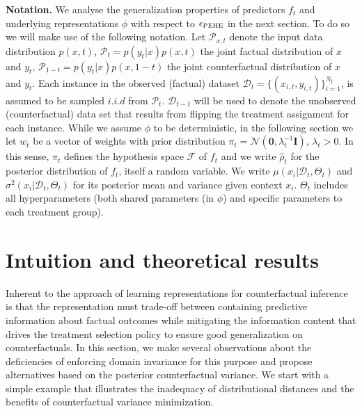 \documentclass[twoside]{article}
\begin{document}
\textbf{Notation.} We analyse the generalization properties of predictors $f_t$ and underlying representations $\phi$ with respect to $\epsilon_{\textsc{PEHE}}$ in the next section. To do so we will make use of the following notation. Let $\mathcal{P}_{x,t}$ denote the input data distribution $p(x,t)$, $\mathcal{P}_{t}=p(y_t|x)p(x,t)$ the joint factual distribution of $x$ and $y_t$, $\mathcal{P}_{1-t}=p(y_t|x)p(x,1-t)$ the joint counterfactual distribution of $x$ and $y_t$. Each instance in the observed (factual) dataset $\mathcal{D}_{t} = \{(x_{i,t}, y_{i,t})\}_{i=1}^{N_t}$, is assumed to be sampled $i.i.d$ from $\mathcal{P}_t$. $\mathcal{D}_{t-1}$ will be used to denote the unobserved (counterfactual) data set that results from flipping the treatment assignment for each instance. While we assume $\phi$ to be deterministic, in the following section we let $w_t$ be a vector of weights with prior distribution $\pi_t = \mathcal N(\mathbf{0},\lambda_t^{-1}\mathbf{I})$, $\lambda_t > 0$. In this sense, $\pi_t$ defines the hypothesis space $\mathcal F$ of $f_t$ and we write $\hat{\rho}_t$ for the posterior distribution of $f_t$, itself a random variable. We write $\mu(x_{i}|\mathcal{D}_t,\Theta_t)$ and $\sigma^2(x_{i}|\mathcal{D}_t,\Theta_t)$ for its posterior mean and variance given context $x_i$. $\Theta_t$ includes all hyperparameters (both shared parameters (in $\phi$) and specific parameters to each treatment group).

\section{Intuition and theoretical results}
Inherent to the approach of learning representations for counterfactual inference is that the representation must trade-off between containing predictive information about factual outcomes while mitigating the information content that drives the treatment selection policy to ensure good generalization on counterfactuals. In this section, we make several observations about the deficiencies of enforcing domain invariance for this purpose and propose alternatives based on the posterior counterfactual variance. We start with a simple example that illustrates the inadequacy of distributional distances and the benefits of counterfactual variance minimization.
\end{document}
